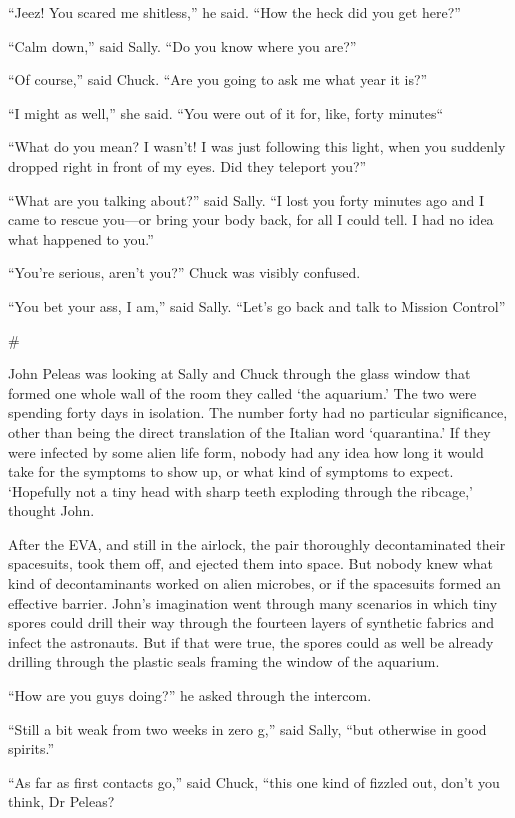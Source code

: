 \documentclass[12pt]{book}
\newcommand{\sbreak}{
\begin{center}
  \#
\end{center}
}
\begin{document}
``Jeez! You scared me shitless,'' he said. ``How the heck did you get here?''

``Calm down,'' said Sally. ``Do you know where you are?''

``Of course,'' said Chuck. ``Are you going to ask me what year it is?''

``I might as well,'' she said. ``You were out of it for, like, forty minutes``

``What do you mean? I wasn't! I was just following this light, when you suddenly dropped right in front of my eyes. Did they teleport you?''

``What are you talking about?'' said Sally. ``I lost you forty minutes ago and I came to rescue you---or bring your body back, for all I could tell. I had no idea what happened to you.''

``You're serious, aren't you?'' Chuck was visibly confused. 

``You bet your ass, I am,'' said Sally. ``Let's go back and talk to Mission Control''

\sbreak

John Peleas was looking at Sally and Chuck through the glass window that formed one whole wall of the room they called `the aquarium.' The two were spending forty days in isolation. The number forty had no particular significance, other than being the direct translation of the Italian word `quarantina.' If they were infected by some alien life form, nobody had any idea how long it would take for the symptoms to show up, or what kind of symptoms to expect. `Hopefully not a tiny head with sharp teeth exploding through the ribcage,' thought John.

After the EVA, and still in the airlock, the pair thoroughly decontaminated their spacesuits,  took them off, and ejected them into space. But nobody knew what kind of decontaminants worked on alien microbes, or if the spacesuits formed an effective barrier. John's imagination went through many scenarios in which tiny spores could drill their way through the fourteen layers of synthetic fabrics and infect the astronauts. But if that were true, the spores could as well be already drilling through the plastic seals framing the window of the aquarium. 

``How are you guys doing?'' he asked through the intercom. 

``Still a bit weak from two weeks in zero g,'' said Sally, ``but otherwise in good spirits.''

``As far as first contacts go,'' said Chuck, ``this one kind of fizzled out, don't you think, Dr Peleas?
\end{document}
